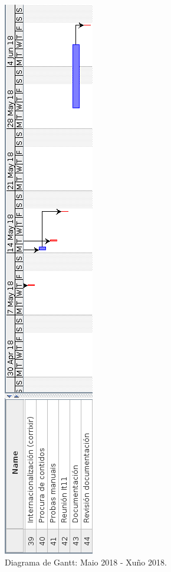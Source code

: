 \begin{figure}[H]
	\centering
	\includegraphics[scale=0.6,keepaspectratio=true]{./images/gantt/gantt4.png}
	\caption{Diagrama de Gantt: Maio 2018 - Xuño 2018. }
	\label{fig:gantt4}
\end{figure}